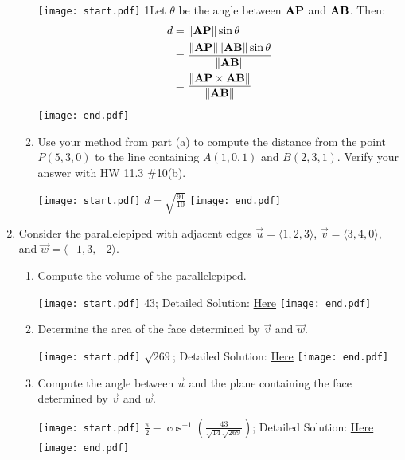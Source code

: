 \documentclass[12pt]{article}
\begin{document}
\begin{enumerate}
\begin{enumerate}
\texttt{[image: start.pdf]}
{{{1\linewidth}{Let $\theta$ be the angle between ${\bf AP}$ and ${\bf AB}$.  Then:
\begin{align*}
d&=\|{\bf AP}\|\sin{\theta}\\
&=\frac{\|{\bf AP}\|\|{\bf AB}\|\sin{\theta}}{\|{\bf AB}\|}\\
&=\frac{\|{\bf AP}\times{\bf AB}\|}{\|{\bf AB}\|}
\end{align*}
}}}
\texttt{[image: end.pdf]}


\item Use your method from part (a) to compute the distance from the point $P(5,3,0)$ to the line containing $A(1,0,1)$ and $B(2,3,1)$.  Verify your answer with HW 11.3 \#10(b).

\texttt{[image: start.pdf]}
{{$d=\sqrt{\frac{91}{10}}$}}
\texttt{[image: end.pdf]}


\end{enumerate}

\item Consider the parallelepiped with adjacent edges $\overrightarrow{u}=\langle1,2,3\rangle$, $\overrightarrow{v}=\langle3,4,0\rangle$, and $\overrightarrow{w}=\langle-1,3,-2\rangle$.

\begin{enumerate}

\item Compute the volume of the parallelepiped.

\texttt{[image: start.pdf]}
{{43; Detailed Solution: \textcolor{blue}{\href{http://www.math.drexel.edu/classes/Calculus/resources/Math200HW/Solutions/04_200_Cross_Product_07.pdf}{Here}}}}
\texttt{[image: end.pdf]}


\item Determine the area of the face determined by $\overrightarrow{v}$ and $\overrightarrow{w}$.

\texttt{[image: start.pdf]}
{{$\sqrt{269}$; Detailed Solution: \textcolor{blue}{\href{http://www.math.drexel.edu/classes/Calculus/resources/Math200HW/Solutions/04_200_Cross_Product_07.pdf}{Here}}}}
\texttt{[image: end.pdf]}


\item Compute the angle between $\overrightarrow{u}$ and the plane containing the face determined by $\overrightarrow{v}$ and $\overrightarrow{w}$.

\texttt{[image: start.pdf]}
{{$\frac{\pi}{2}-\cos^{-1}\left(\frac{43}{\sqrt{14}\sqrt{269}}\right)$; Detailed Solution: \textcolor{blue}{\href{http://www.math.drexel.edu/classes/Calculus/resources/Math200HW/Solutions/04_200_Cross_Product_07.pdf}{Here}}}}
\texttt{[image: end.pdf]}



\end{enumerate}
\end{enumerate}
\end{document}
